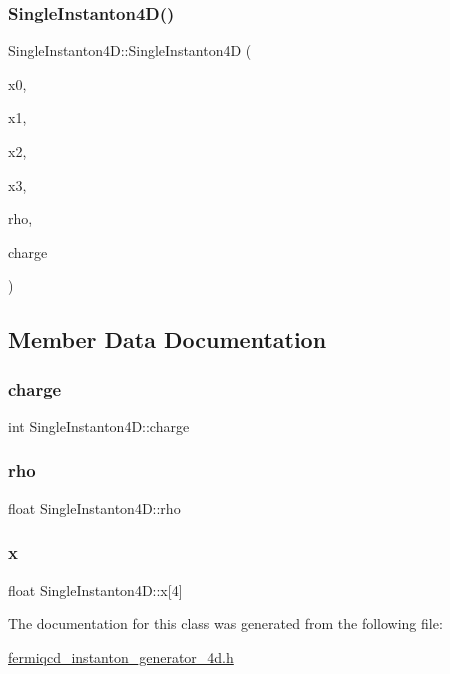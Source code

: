 \subsubsection{\texorpdfstring{Single\+Instanton4\+D()}{SingleInstanton4D()}}
{\footnotesize\ttfamily Single\+Instanton4\+D\+::\+Single\+Instanton4D (\begin{DoxyParamCaption}\item[{float}]{x0,  }\item[{float}]{x1,  }\item[{float}]{x2,  }\item[{float}]{x3,  }\item[{float}]{rho,  }\item[{int}]{charge }\end{DoxyParamCaption})\hspace{0.3cm}{\ttfamily [inline]}}



\subsection{Member Data Documentation}
\mbox{\label{class_single_instanton4_d_a4a503a7904b1a17e7b192b66885641cb}} 
\subsubsection{\texorpdfstring{charge}{charge}}
{\footnotesize\ttfamily int Single\+Instanton4\+D\+::charge}

\mbox{\label{class_single_instanton4_d_a5aaaa7bb2480121238f73413722f571c}} 
\subsubsection{\texorpdfstring{rho}{rho}}
{\footnotesize\ttfamily float Single\+Instanton4\+D\+::rho}

\mbox{\label{class_single_instanton4_d_a19c5efb9db26b759c75ef5bea8a0748e}} 
\subsubsection{\texorpdfstring{x}{x}}
{\footnotesize\ttfamily float Single\+Instanton4\+D\+::x\mbox{[}4\mbox{]}}



The documentation for this class was generated from the following file\+:\begin{DoxyCompactItemize}
\item 
\hyperlink{fermiqcd__instanton__generator__4d_8h}{fermiqcd\+\_\+instanton\+\_\+generator\+\_\+4d.\+h}\end{DoxyCompactItemize}
